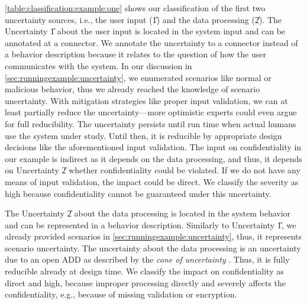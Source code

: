 \autoref{table:classification:example:one} shows our classification of the first two uncertainty sources, i.e., the user input (\U{1}) and the data processing (\U{2}).
The Uncertainty \U{1} about the user input is located in the system input and can be annotated at a connector.
We annotate the uncertainty to a connector instead of a behavior description because it relates to the question of how the user communicates with the system.
In our discussion in \autoref{sec:runningexample:uncertainty}, we enumerated scenarios like normal or malicious behavior, thus we already reached the knowledge of scenario uncertainty.
With mitigation strategies like proper input validation, we can at least partially reduce the uncertainty---more optimistic experts could even argue for full reducibility.
The uncertainty persists until run time when actual humans use the system under study.
Until then, it is reducible by appropriate design decisions like the aforementioned input validation.
The input on confidentiality in our example is indirect as it depends on the data processing, and thus, it depends on Uncertainty \U{2} whether confidentiality could be violated.
If we do not have any means of input validation, the impact could be direct.
We classify the severity as high because confidentiality cannot be guaranteed under this uncertainty.

The Uncertainty \U{2} about the data processing is located in the system behavior and can be represented in a behavior description.
Similarly to Uncertainty \U{1}, we already provided scenarios in \autoref{sec:runningexample:uncertainty}, thus, it represents scenario uncertainty.
The uncertainty about the data processing is an uncertainty due to an open \ac{ADD} as described by the \emph{cone of uncertainty} \cite{mcconnell_software_1998}.
Thus, it is fully reducible already at design time.
We classify the impact on confidentiality as direct and high, because improper processing directly and severely affects the confidentiality, e.g., because of missing validation or encryption.


